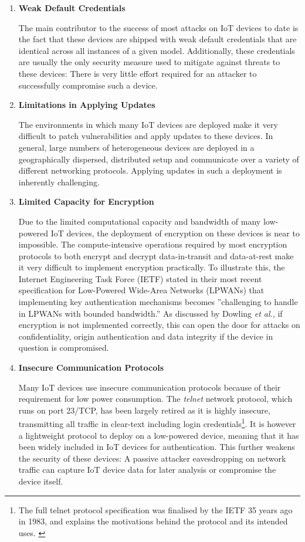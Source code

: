 \begin{enumerate} \label{ReasonsForInsecureIoTDevices}
\item \textbf{Weak Default Credentials}

The main contributor to the success of most attacks on IoT devices  to date is the fact that these devices are shipped with weak default credentials that are identical across all instances of a given model. Additionally, these credentials are usually the only security measure used to mitigate against threats to these devices: There is very little effort required for an attacker to successfully compromise such a device.

\item \textbf{Limitations in Applying Updates}

The environments in which many IoT devices are deployed make it very difficult to patch vulnerabilities and apply updates to these devices. In general, large numbers of heterogeneous devices are deployed in a geographically dispersed, distributed setup and communicate over a variety of different networking protocols. Applying updates in such a deployment is inherently challenging.

\item \textbf{Limited Capacity for Encryption}

Due to the limited computational capacity and bandwidth of many low-powered IoT devices, the deployment of encryption on these devices is near to impossible. The compute-intensive operations required by most encryption protocols to both encrypt and decrypt data-in-transit and data-at-rest make it very difficult to implement encryption practically. To illustrate this, the Internet Engineering Task Force (IETF) stated in their most recent specification for Low-Powered Wide-Area Networks (LPWANs) that implementing key authentication mechanisms becomes ''challenging to handle in LPWANs with bounded bandwidth.'' \cite{ietf-lpwan-overview-10} As discussed by Dowling \textit{et al.}, if encryption is not implemented correctly, this can open the door for attacks on confidentiality, origin authentication and data integrity if the device in question is compromised. \cite{Dowling2017}

\item \textbf{Insecure Communication Protocols}

Many IoT devices use insecure communication protocols because of their requirement for low power consumption. The \textit{telnet} network protocol, which runs on port 23/TCP, has been largely retired as it is highly insecure, transmitting all traffic in clear-text including login credentials\footnote{The full telnet  protocol specification was finalised by the IETF 35 years ago in 1983, and explains the motivations behind the protocol and its intended uses. \cite{rfc854}}. It is however a lightweight protocol to deploy on a low-powered device, meaning that it has been widely included in IoT devices for authentication. This further weakens the security of these devices: A passive attacker eavesdropping on network traffic can capture IoT device data for later analysis or compromise the device itself.

\end{enumerate}

